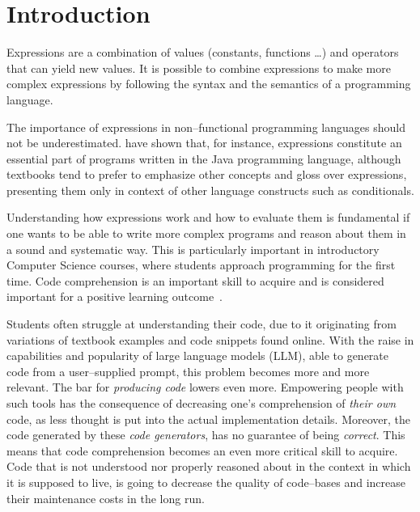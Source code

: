 \chapter{Introduction}\label{sec:intro}

\begin{chapterBody}

Expressions are a combination of values (constants, functions \ldots) and
operators that can yield new values.
It is possible to combine expressions to make more complex expressions by
following the syntax and the semantics of a programming language.

The importance of expressions in non–functional programming languages should
not be  underestimated.
\citet{chiodini_expressions_2022} have shown that, for instance, expressions
constitute an essential part of programs written in the Java programming
language, although textbooks tend to prefer to emphasize other concepts and
gloss over expressions, presenting them only in context of other language
constructs such as conditionals.

Understanding how expressions work and how to evaluate them is fundamental if
one wants to be able to write more complex programs and reason about them in a
sound and systematic way.
This is particularly important in introductory Computer Science courses, where
students approach programming for the first time. Code comprehension is an
important skill to acquire and is considered important for a positive learning
outcome~\cite{donaldson_flexible_2018}.

Students often struggle at understanding their code, due to it originating from
variations of textbook examples and code snippets found online.
With the raise in capabilities and popularity of large language 
models (LLM), able to generate code from a user–supplied prompt, this problem
becomes more and more relevant.
The bar for \textit{producing code} lowers even more.
Empowering people with such tools has the consequence of decreasing one's 
comprehension of \textit{their own} code, as less thought is put into the
actual implementation details. Moreover, the code generated by these
\textit{code generators}, has no guarantee of being \textit{correct}.
This means that code comprehension becomes an even more critical skill to
acquire.
Code that is not understood nor properly reasoned about in the context in which 
it is supposed to live, is going to decrease the quality of code–bases and
increase their maintenance costs in the long run.


\end{chapterBody}
